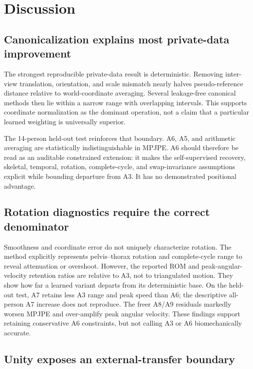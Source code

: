 \section{Discussion}
\label{sec:discussion}

\subsection{Canonicalization explains most private-data improvement}

The strongest reproducible private-data result is deterministic. Removing
inter-view translation, orientation, and scale mismatch nearly halves
pseudo-reference distance relative to world-coordinate averaging. Several
leakage-free canonical methods then lie within a narrow range with overlapping
intervals. This supports coordinate normalization as the dominant operation,
not a claim that a particular learned weighting is universally superior.

The 14-person held-out test reinforces that boundary. A6, A5, and arithmetic
averaging are statistically indistinguishable in MPJPE. A6 should therefore be
read as an auditable constrained extension: it makes the self-supervised
recovery, skeletal, temporal, rotation, complete-cycle, and swap-invariance
assumptions explicit while bounding departure from A3. It has no demonstrated
positional advantage.

\subsection{Rotation diagnostics require the correct denominator}

Smoothness and coordinate error do not uniquely characterize rotation. The
method explicitly represents pelvis--thorax rotation and complete-cycle range
to reveal attenuation or overshoot. However, the reported ROM and
peak-angular-velocity retention ratios are relative to A3, not to triangulated
motion. They show how far a learned variant departs from its deterministic
base. On the held-out test, A7 retains less A3 range and peak speed than A6;
the descriptive all-person A7 increase does not reproduce. The freer A8/A9
residuals markedly worsen MPJPE and over-amplify peak angular velocity. These
findings support retaining conservative A6 constraints, but not calling A3 or
A6 biomechanically accurate.

\subsection{Unity exposes an external-transfer boundary}

